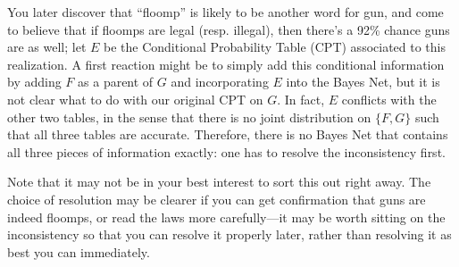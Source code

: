 \documentclass{article}
\begin{document}
\begin{example}
		You later discover that ``floomp'' is likely to be another word for gun, and come to believe that if floomps are legal (resp. illegal), then there's a 92\% chance guns are as well; let $E$ be the Conditional Probability Table (CPT) associated to this realization.
		A first reaction might be to simply add this conditional information by adding $F$ as a parent of $G$ and incorporating $E$ into the Bayes Net, but it is not clear what to do with our original CPT on $G$.
		In fact, $E$ conflicts with the other two tables, in the sense that there is no joint distribution on $\{F, G\}$ such that all three tables are accurate. 
		Therefore, there is no Bayes Net that contains all three pieces of information exactly: one has to resolve the inconsistency first.
			
			
			
		Note that it may not be in your best interest to sort this out right away. The choice of resolution may be clearer if you can get confirmation that guns are indeed floomps, or read the laws more carefully---it may be worth sitting on the inconsistency so that you can resolve it properly later, rather than resolving it as best you can immediately.

%			
%			
%			
%
		

\end{example}
\end{document}
